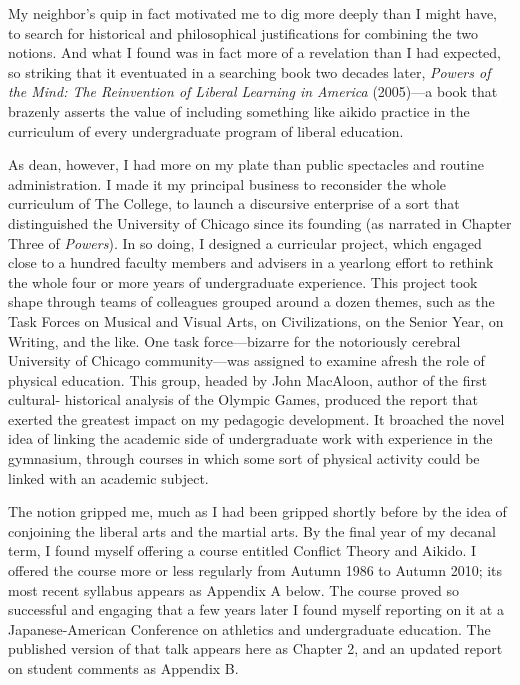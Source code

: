 My neighbor's quip in fact motivated me to dig more deeply than I might have, to search for historical and philosophical justifications for combining the two notions. And what I found was in fact more of a revelation than I had expected, so striking that it eventuated in a searching book two decades later, \emph{Powers of the Mind: The Reinvention of Liberal Learning in America} (2005)---a book that brazenly asserts the value of including something like aikido practice in the curriculum of every undergraduate program of liberal education.

As dean, however, I had more on my plate than public spectacles and routine administration. I made it my principal business to reconsider the whole curriculum of The College, to launch a discursive enterprise of a sort that distinguished the University of Chicago since its founding (as narrated in Chapter Three of \emph{Powers}). In so doing, I designed a curricular project, which engaged close to a hundred faculty members and advisers in a yearlong effort to rethink the whole four or more years of undergraduate experience. This project took shape through teams of colleagues grouped around a dozen themes, such as the Task Forces on Musical and Visual Arts, on Civilizations, on the Senior Year, on Writing, and the like. One task force---bizarre for the notoriously cerebral University of Chicago community---was assigned to examine afresh the role of physical education. This group, headed by John MacAloon, author of the first cultural- historical analysis of the Olympic Games, produced the report that exerted the greatest impact on my pedagogic development. It broached the novel idea of linking the academic side of undergraduate work with experience in the gymnasium, through courses in which some sort of physical activity could be linked with an academic subject.

The notion gripped me, much as I had been gripped shortly before by the idea of conjoining the liberal arts and the martial arts. By the final year of my decanal term, I found myself offering a course entitled Conflict Theory and Aikido. I offered the course more or less regularly from Autumn 1986 to Autumn 2010; its most recent syllabus appears as Appendix A below. The course proved so successful and engaging that a few years later I found myself reporting on it at a Japanese-American Conference on athletics and undergraduate education. The published version of that talk appears here as Chapter 2, and an updated report on student comments as Appendix B. 

